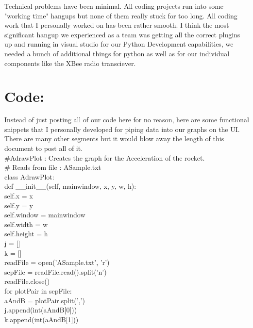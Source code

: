 \documentclass{article}
\begin{document}
Technical problems have been minimal. All coding projects run into some "working time" hangups but none of them really stuck for too long. All coding work that I personally worked on has been rather smooth. I think the most significant hangup we experienced as a team was getting all the correct plugins up and running in visual studio for our Python Development capabilities, we needed a bunch of additional things for python as well as for our individual components like the XBee radio transciever.\\


\section{Code:}

Instead of just posting all of our code here for no reason, here are some functional snippets that I personally developed for piping data into our graphs on the UI. There are many other segments but it would blow away the length of this document to post all of it.\\

\#AdrawPlot  : Creates the graph for the Acceleration of the rocket.\\
\#           Reads from file : ASample.txt\\
class AdrawPlot:\\
        def \_\_init\_\_(self, mainwindow, x, y, w, h):\\
            self.x = x\\
            self.y = y\\
            self.window = mainwindow\\
            self.width = w\\
            self.height = h\\

            j = []\\
            k = []\\
            readFile = open('ASample.txt', 'r')\\
            sepFile = readFile.read().split('n')\\
            readFile.close()\\
            
            for plotPair in sepFile:\\
                aAndB = plotPair.split(',')\\
                j.append(int(aAndB[0]))\\
                k.append(int(aAndB[1]))\\
\end{document}
